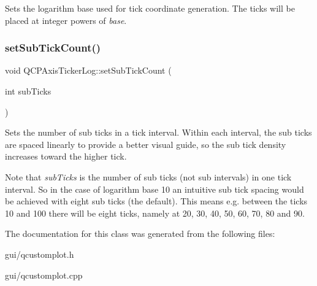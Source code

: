 Sets the logarithm base used for tick coordinate generation. The ticks will be placed at integer powers of {\itshape base}. \mbox{\label{classQCPAxisTickerLog_ad51989c798c0cfd50936d77aac57c56a}} 
\subsubsection{\texorpdfstring{set\+Sub\+Tick\+Count()}{setSubTickCount()}}
{\footnotesize\ttfamily void Q\+C\+P\+Axis\+Ticker\+Log\+::set\+Sub\+Tick\+Count (\begin{DoxyParamCaption}\item[{int}]{sub\+Ticks }\end{DoxyParamCaption})}

Sets the number of sub ticks in a tick interval. Within each interval, the sub ticks are spaced linearly to provide a better visual guide, so the sub tick density increases toward the higher tick.

Note that {\itshape sub\+Ticks} is the number of sub ticks (not sub intervals) in one tick interval. So in the case of logarithm base 10 an intuitive sub tick spacing would be achieved with eight sub ticks (the default). This means e.\+g. between the ticks 10 and 100 there will be eight ticks, namely at 20, 30, 40, 50, 60, 70, 80 and 90. 

The documentation for this class was generated from the following files\+:\begin{DoxyCompactItemize}
\item 
gui/qcustomplot.\+h\item 
gui/qcustomplot.\+cpp\end{DoxyCompactItemize}
